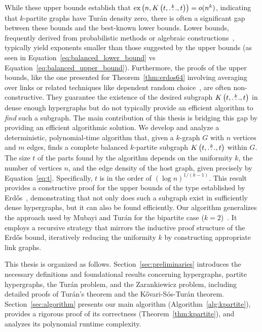 While these upper bounds establish that $\text{ex} \left( n, K\left(t, \overset{k}{\dots}, t\right) \right) = o(n^k)$,
indicating that $k$-partite graphs have Turán density zero, there is often a significant gap between these bounds and the best-known lower bounds.
Lower bounds, frequently derived from probabilistic methods or algebraic constructions~\cite{kollar1996norm, brown1966graphs, conlon2020random},
typically yield exponents smaller than those suggested by the upper bounds
(as seen in Equation~\eqref{eq:balanced_lower_bound} vs Equation~\eqref{eq:balanced_upper_bound}).
Furthermore, the proofs of the upper bounds, like the one presented for Theorem~\ref{thm:erdos64}
involving averaging over links or related techniques like dependent random choice~\cite{fox2011dependent},
are often non-constructive.
They guarantee the existence of the desired subgraph $K\left(t, \overset{k}{\dots}, t\right)$ in dense enough hypergraphs but do not typically provide an efficient algorithm to \emph{find} such a subgraph.
The main contribution of this thesis is bridging this gap by providing an efficient algorithmic solution.
We develop and analyze a deterministic, polynomial-time algorithm that, given a $k$-graph $G$ with $n$ vertices and $m$ edges,
finds a complete balanced $k$-partite subgraph $K\left(t, \overset{k}{\dots}, t\right)$ within $G$.
The size $t$ of the parts found by the algorithm depends on the uniformity $k$, the number of vertices $n$, and the edge density of the host graph, given precisely by Equation~\eqref{eq:t}.
Specifically, $t$ is in the order of $(\log n)^{1/(k-1)}$.
This result provides a constructive proof for the upper bounds of the type established by Erdős~\cite{Erods1964},
demonstrating that not only does such a subgraph exist in sufficiently dense hypergraphs, but it can also be found efficiently.
Our algorithm generalizes the approach used by Mubayi and Turán for the bipartite case ($k=2$)~\cite{MUBAYI2010174}.
It employs a recursive strategy that mirrors the inductive proof structure of the Erdős bound,
iteratively reducing the uniformity $k$ by constructing appropriate link graphs.

This thesis is organized as follows.
Section~\ref{sec:preliminaries} introduces the necessary definitions and foundational results concerning hypergraphs, partite hypergraphs, the Turán problem, and the Zarankiewicz problem,
including detailed proofs of Turán's theorem and the Kővari-Sós-Turán theorem.
Section~\ref{sec:algorithm} presents our main algorithm (Algorithm~\ref{alg:kpartite}), provides a rigorous proof of its correctness (Theorem~\ref{thm:kpartite}),
and analyzes its polynomial runtime complexity.